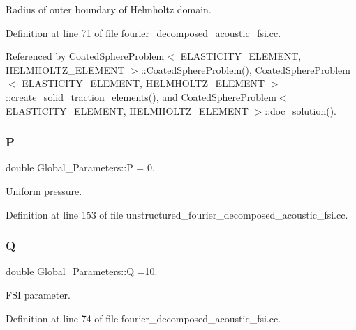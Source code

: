 Radius of outer boundary of Helmholtz domain. 



Definition at line 71 of file fourier\+\_\+decomposed\+\_\+acoustic\+\_\+fsi.\+cc.



Referenced by Coated\+Sphere\+Problem$<$ E\+L\+A\+S\+T\+I\+C\+I\+T\+Y\+\_\+\+E\+L\+E\+M\+E\+N\+T, H\+E\+L\+M\+H\+O\+L\+T\+Z\+\_\+\+E\+L\+E\+M\+E\+N\+T $>$\+::\+Coated\+Sphere\+Problem(), Coated\+Sphere\+Problem$<$ E\+L\+A\+S\+T\+I\+C\+I\+T\+Y\+\_\+\+E\+L\+E\+M\+E\+N\+T, H\+E\+L\+M\+H\+O\+L\+T\+Z\+\_\+\+E\+L\+E\+M\+E\+N\+T $>$\+::create\+\_\+solid\+\_\+traction\+\_\+elements(), and Coated\+Sphere\+Problem$<$ E\+L\+A\+S\+T\+I\+C\+I\+T\+Y\+\_\+\+E\+L\+E\+M\+E\+N\+T, H\+E\+L\+M\+H\+O\+L\+T\+Z\+\_\+\+E\+L\+E\+M\+E\+N\+T $>$\+::doc\+\_\+solution().

\mbox{\label{namespaceGlobal__Parameters_a31fb55c20db4aa0127aafa20f0d76731}} 
\subsubsection{\texorpdfstring{P}{P}}
{\footnotesize\ttfamily double Global\+\_\+\+Parameters\+::P = 0.}



Uniform pressure. 



Definition at line 153 of file unstructured\+\_\+fourier\+\_\+decomposed\+\_\+acoustic\+\_\+fsi.\+cc.

\mbox{\label{namespaceGlobal__Parameters_a7814fddf663e56168174a42d2cd6b4c1}} 
\subsubsection{\texorpdfstring{Q}{Q}}
{\footnotesize\ttfamily double Global\+\_\+\+Parameters\+::Q =10.}



F\+SI parameter. 



Definition at line 74 of file fourier\+\_\+decomposed\+\_\+acoustic\+\_\+fsi.\+cc.



